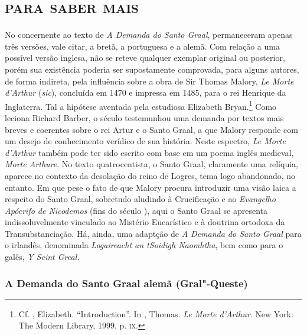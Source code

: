 \part{\textsc{para saber mais}}



No concernente ao texto de \textit{A Demanda do Santo Graal}, permaneceram
apenas três versões, vale citar, a bretã, a portuguesa e a alemã. Com relação a
uma possível versão inglesa, não se reteve qualquer exemplar original ou
posterior, porém sua existência poderia ser supostamente comprovada, para alguns
autores, de forma indireta, pela influência sobre a obra de Sir Thomas Malory,
\textit{Le Morte d’Arthur} (\textit{sic}), concluída em 1470 e impressa em 1485,
para o rei Henrique  da Inglaterra. Tal a hipótese aventada pela
estudiosa Elizabeth Bryan.\footnote{ Cf. , Elizabeth. ``Introduction''. In
, Thomas. \textit{Le Morte d'Arthur}. New York: The Modern Library, 1999,
p. \textsc{ix}. } Como leciona Richard Barber, o século  testemunhou
uma demanda por textos mais breves e coerentes sobre o rei Artur e o Santo
Graal, a que Malory responde com um desejo de conhecimento verídico de sua história.
Neste espectro, \textit{Le Morte d’Arthur} também pode ter sido
escrito com base em um poema inglês medieval, \textit{Morte Arthure}. No texto
quatrocentista, o Santo Graal, claramente uma relíquia, aparece no contexto da
desolação do reino de Logres, tema logo abandonado, no entanto. Em que pese o
fato de que Malory procura introduzir uma visão laica a respeito do Santo Graal,
sobretudo aludindo à Crucificação e ao \textit{Evangelho Apócrifo de Nicodemos}
(fins do século ), aqui o Santo Graal se apresenta indissoluvelmente
vinculado ao Mistério Eucarístico e à doutrina ortodoxa da Transubstanciação.
Há, ainda, uma adaptção de \textit{A Demanda do Santo Graal}  para o irlandês,
denominada \textit{Logaireacht an tSoidigh Naomhtha}, bem como para o galês,
\textit{Y Seint Greal.}

\section{A Demanda do Santo Graal alemã (Gral"-Queste)}

